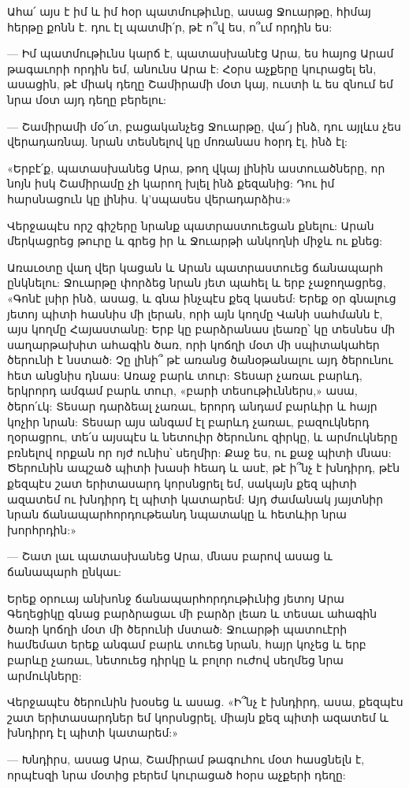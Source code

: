 \documentclass{article}
\begin{document}
{Ահա՛ այս է իմ և իմ հօր պատմութիւնը, ասաց Ջուարթը, հիմայ հերթը քոնն է. դու էլ պատմի՛ր, թէ ո՞վ ես, ո՞ւմ որդին ես:

— Իմ պատմութիւնս կարճ է, պատասխանէց Արա, ես հայոց Արամ թագաւորի որդին եմ, անունս Արա է: Հօրս աչքերը կուրացել են, ասացին, թէ միակ դեղը Շամիրամի մօտ կայ, ուստի և ես զնում եմ նրա մօտ այդ դեղը բերելու:

— Շամիրամի մօ՜տ, բացականչեց Ջուարթը, վա՜յ ինձ, դու այլևս չես վերադառնայ. նրան տեսնելով կը մոռանաս հօրդ էլ, ինձ էլ:

«Երբէ՛ք, պատասխանեց Արա, թող վկայ լինին աստուածները, որ նոյն իսկ Շամիրամը չի կարող խլել ինձ քեզանից: Դու իմ հարսնացուն կը լինիս. կ'սպասես վերադարձիս:»

Վերջապէս որշ գիշերը նրանք պատրաստուեցան քնելու: Արան մերկացրեց թուրը և գրեց իր և Ջուարթի անկողնի միջև ու քնեց:

Առաւօտը վաղ վեր կացան և Արան պատրաստուեց ճանապարհ ընկնելու: Ջուարթը փորձեց նրան յետ պահել և երբ չաջողացրեց, «Գոնէ լսիր ինձ, ասաց, և գնա ինչպէս քեզ կասեմ: Երեք օր գնալուց յետոյ պիտի հասնիս մի լերան, որի այն կողմը Վանի սահմանն է, այս կողմը Հայաստանը: Երբ կը բարձրանաս լեառը՝ կը տեսնես մի սաղարթախիտ ահագին ծառ, որի կոճղի մօտ մի սպիտակահեր ծերունի է նստած: Չը լինի՞ թէ առանց ծանօթանալու այդ ծերունու հետ անցնիս դնաս: Առաջ բարև տուր: Տեսար չառաւ բարևդ, երկրորդ ամգամ բարև տուր, «բարի տեսութիւններս,» ասա, ծերո՛ւկ: Տեսար դարձեալ չառաւ, երորդ անդամ բարևիր և հայր կոչիր նրան: Տեսար այս անգամ էլ բարևդ չառաւ, բազուկներդ ղօրացրու, տե՛ս այսպէս և նետուիր ծերունու զիրկը, և արմուկները բռնելով որքան որ ոյժ ունիս՝ սեղմիր: Քաջ ես, ու քաջ պիտի մնաս: Ծերունին ապշած պիտի խասի հեադ և ասէ, թէ ի՞նչ է խնդիրդ, թէն քեզպէս շատ երիտասարդ կորսնցրել եմ, սակայն քեզ պիտի ազատեմ ու խնդիրդ էլ պիտի կատարեմ: Այդ ժամանակ յայտնիր նրան ճանապարհորդութեանդ նպատակը և հետևիր նրա խորհրդին:»

— Շատ լաւ պատասխանեց Արա, մնաս բարով ասաց և ճանապարհ ընկաւ:

Երեք օրուայ անխոնջ ճանապարհորդութիւնից յետոյ Արա Գեղեցիկը գնաց բարձրացաւ մի բարձր լեառ և տեսաւ ահագին ծառի կոճղի մօտ մի ծերունի մստած: Ջուարթի պատուէրի համեմատ երեք անգամ բարև տուեց նրան, հայր կոչեց և երբ բարևը չառաւ, նետուեց դիրկը և բոլոր ուժով սեղմեց նրա արմուկները:

Վերջապէս ծերունին խօսեց և ասաց. «Ի՞նչ է խնդիրդ, ասա, քեզպէս շատ երիտասարդներ եմ կորսնցրել, միայն քեզ պիտի ազատեմ և խնդիրդ էլ պիտի կատարեմ:»

— Խնդիրս, ասաց Արա, Շամիրամ թագուհու մօտ հասցնելն է, որպէսզի նրա մօտից բերեմ կուրացած հօրս աչքերի դեղը:

}
\end{document}
